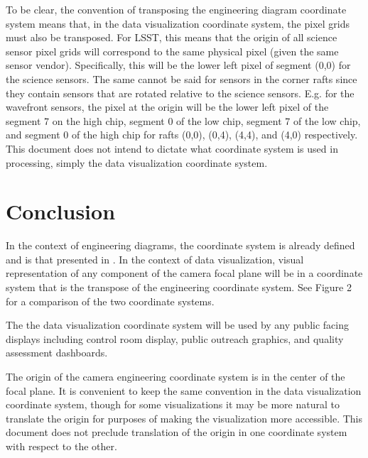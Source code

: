 To be clear, the convention of transposing the engineering diagram coordinate system means that, in the data visualization coordinate system, the pixel grids must also be transposed.  For LSST, this means that the origin of all science sensor pixel grids will correspond to the same physical pixel (given the same sensor vendor).  Specifically, this will be the lower left pixel of segment (0,0) for the science sensors.  The same cannot be said for sensors in the corner rafts since they contain sensors that are rotated relative to the science sensors.  E.g. for the wavefront sensors, the pixel at the origin will be the lower left pixel of the segment 7 on the high chip, segment 0 of the low chip, segment 7 of the low chip, and segment 0 of the high chip for rafts (0,0), (0,4), (4,4), and (4,0) respectively.  This document does not intend to dictate what coordinate system is used in processing, simply the data visualization coordinate system.

\section{Conclusion}
In the context of engineering diagrams, the coordinate system is already defined and is that presented in . In the context of data visualization, visual representation of any component of the camera focal plane will be in a coordinate system that is the transpose of the engineering coordinate system.  See Figure 2 for a comparison of the two coordinate systems.

The the data visualization coordinate system will be used by any public facing displays including control room display, public outreach graphics, and quality assessment dashboards.

The origin of the camera engineering coordinate system is in the center of the focal plane. It is convenient to keep the same convention in the data visualization coordinate system, though for some visualizations it may be more natural to translate the origin for purposes of making the visualization more accessible. This document does not preclude translation of the origin in one coordinate system with respect to the other.

